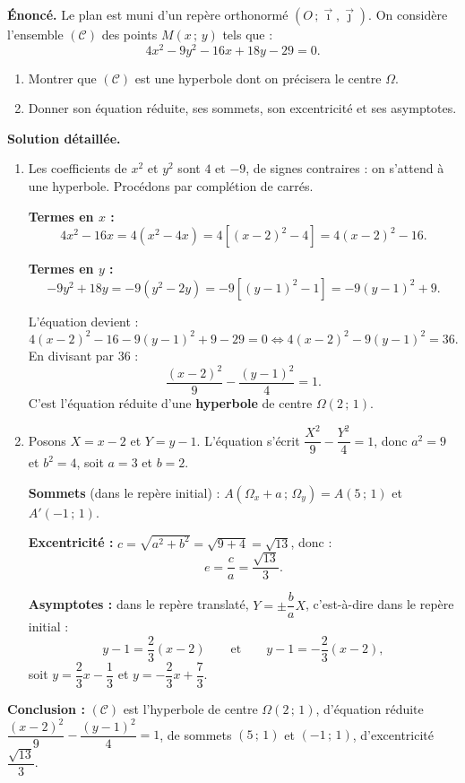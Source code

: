 \documentclass[11pt]{article}
\begin{document}
\begin{exoresolu}
\textbf{Énoncé.} Le plan est muni d'un repère orthonormé $(O\,;\vec{\imath},\vec{\jmath})$. On considère l'ensemble $(\mathcal{C})$ des points $M(x\,;\,y)$ tels que :
\[ 4x^2 - 9y^2 - 16x + 18y - 29 = 0. \]
\begin{enumerate}
\item Montrer que $(\mathcal{C})$ est une hyperbole dont on précisera le centre $\Omega$.
\item Donner son équation réduite, ses sommets, son excentricité et ses asymptotes.
\end{enumerate}
\tcblower
\textbf{Solution détaillée.}
\begin{enumerate}
\item Les coefficients de $x^2$ et $y^2$ sont $4$ et $-9$, de signes contraires : on s'attend à une hyperbole. Procédons par complétion de carrés.

\textbf{Termes en $x$ :}
\[ 4x^2 - 16x = 4(x^2 - 4x) = 4\left[(x - 2)^2 - 4\right] = 4(x-2)^2 - 16. \]

\textbf{Termes en $y$ :}
\[ -9y^2 + 18y = -9(y^2 - 2y) = -9\left[(y - 1)^2 - 1\right] = -9(y-1)^2 + 9. \]

L'équation devient :
\[ 4(x-2)^2 - 16 - 9(y-1)^2 + 9 - 29 = 0 \iff 4(x-2)^2 - 9(y-1)^2 = 36. \]
En divisant par $36$ :
\[ \frac{(x-2)^2}{9} - \frac{(y-1)^2}{4} = 1. \]
C'est l'équation réduite d'une \textbf{hyperbole} de centre $\Omega(2\,;\,1)$.

\item Posons $X = x - 2$ et $Y = y - 1$. L'équation s'écrit $\dfrac{X^2}{9} - \dfrac{Y^2}{4} = 1$, donc $a^2 = 9$ et $b^2 = 4$, soit $a = 3$ et $b = 2$.

\textbf{Sommets} (dans le repère initial) : $A(\Omega_x + a\,;\,\Omega_y) = A(5\,;\,1)$ et $A'(-1\,;\,1)$.

\textbf{Excentricité :} $c = \sqrt{a^2 + b^2} = \sqrt{9 + 4} = \sqrt{13}$, donc :
\[ e = \frac{c}{a} = \frac{\sqrt{13}}{3}. \]

\textbf{Asymptotes :} dans le repère translaté, $Y = \pm \dfrac{b}{a} X$, c'est-à-dire dans le repère initial :
\[ y - 1 = \frac{2}{3}(x - 2) \qquad \text{et} \qquad y - 1 = -\frac{2}{3}(x - 2), \]
soit $y = \dfrac{2}{3}x - \dfrac{1}{3}$ et $y = -\dfrac{2}{3}x + \dfrac{7}{3}$.
\end{enumerate}
\textbf{Conclusion :} $(\mathcal{C})$ est l'hyperbole de centre $\Omega(2\,;\,1)$, d'équation réduite $\dfrac{(x-2)^2}{9} - \dfrac{(y-1)^2}{4} = 1$, de sommets $(5\,;\,1)$ et $(-1\,;\,1)$, d'excentricité $\dfrac{\sqrt{13}}{3}$.
\end{exoresolu}
\end{document}
